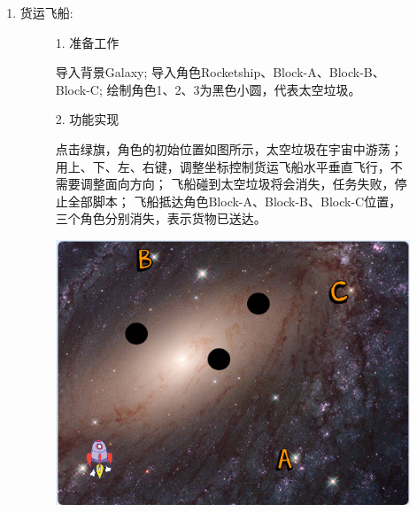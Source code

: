 \documentclass[10pt, a4paper]{article}
\begin{document}
\begin{enumerate}
        \item 货运飞船:
        \begin{figure}[htbp]
            \begin{minipage}{.6\textwidth}
                1. 准备工作
                \begin{tasks}[label = (\arabic*)]
                    \task 导入背景Galaxy;
                    \task 导入角色Rocketship、Block-A、Block-B、Block-C;
                    \task 绘制角色1、2、3为黑色小圆，代表太空垃圾。
                \end{tasks}
                2. 功能实现
                \begin{tasks}[label = (\arabic*)]
                    \task 点击绿旗，角色的初始位置如图所示，太空垃圾在宇宙中游荡；
                    \task 用上、下、左、右键，调整坐标控制货运飞船水平垂直飞行，不需要调整面向方向；
                    \task 飞船碰到太空垃圾将会消失，任务失败，停止全部脚本；
                    \task 飞船抵达角色Block-A、Block-B、Block-C位置，三个角色分别消失，表示货物已送达。
                \end{tasks}
            \end{minipage}
            \begin{minipage}{.37\textwidth}
                \centering
                \includegraphics[width=\textwidth]{37.jpg}
            \end{minipage}
        \end{figure}
    \end{enumerate}
\end{document}
